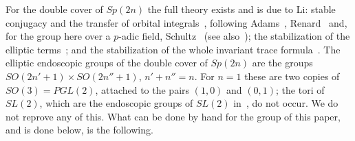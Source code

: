 For the double cover of $Sp(2n)$ the full theory exists and is due to
Li: stable conjugacy and the transfer of orbital
integrals~\cite{Li11}, following Adams~\cite{Ad98}, Renard~\cite{Re99} and,
for the group here over a $p$-adic field, Schultz~\cite{Sc98} (see
also~\cite{Ho10}); the stabilization of the elliptic
terms~\cite{Li15}; and the stabilization of the whole invariant trace
formula~\cite{Li21}. The elliptic endoscopic groups of the double cover of
$Sp(2n)$ are the groups $SO(2n'+1)\times SO(2n''+1)$, $n'+n''=n$. For
$n=1$ these are two copies of $SO(3)=PGL(2)$, attached to the pairs
$(1,0)$ and $(0,1)$; the tori of $SL(2)$, which are the endoscopic groups
of $SL(2)$ in~\cite{LL79}, do not occur. We do not reprove any of this.
What can be done by hand for the group of this paper, and is done below,
is the following.

